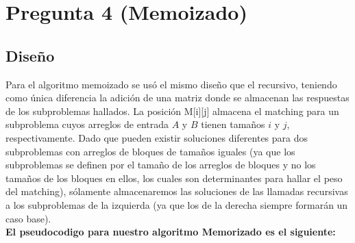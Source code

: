 \documentclass{article}
\begin{document}
\newpage
\section {Pregunta 4 (Memoizado)}
\subsection{Diseño}
Para el algoritmo memoizado se usó el mismo diseño que el recursivo, teniendo como única diferencia la adición de una matriz donde se almacenan las respuestas de los subproblemas hallados. La posición M[i][j] almacena el matching para un subproblema cuyos arreglos de entrada $A$ y $B$ tienen tamaños $i$ y $j$, respectivamente. Dado que pueden existir soluciones diferentes para dos subproblemas con arreglos de bloques de tamaños iguales (ya que los subproblemas se definen por el tamaño de los arreglos de bloques y no los tamaños de los bloques en ellos, los cuales son determinantes para hallar el peso del matching), sólamente almacenaremos las soluciones de las llamadas recursivas a los subproblemas de la izquierda (ya que los de la derecha siempre formarán un caso base). \\
\textbf{El pseudocodigo para nuestro algoritmo Memorizado es el siguiente:}
\end{document}
